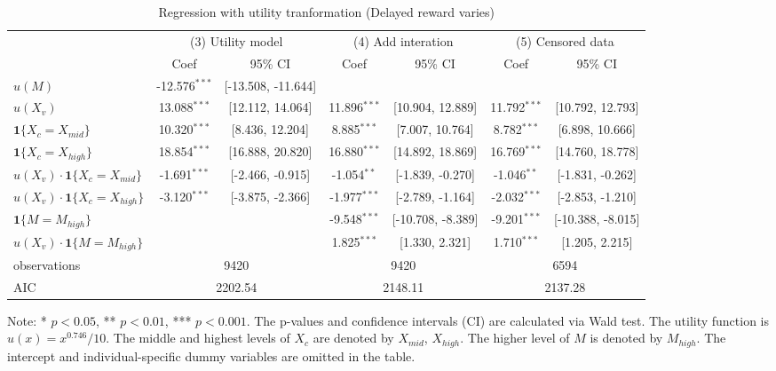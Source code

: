 \documentclass[12pt]{article}
\begin{document}
\begin{table}
    \centering
    \caption{Regression with utility tranformation (Delayed reward varies)}
    \vspace*{12pt}
        
\begin{tabular}{lcccccc}
  \hline
   & \multicolumn{2}{c}{(3) Utility model} & \multicolumn{2}{c}{(4) Add interation} & \multicolumn{2}{c}{(5) Censored data} \\ & Coef & 95\% CI & Coef & 95\% CI & Coef & 95\% CI \\ \hline
$u(M)$ & -12.576$^{***}$ & [-13.508, -11.644] &  &  &  &  \\ 
  $u(X_v)$ & 13.088$^{***}$ & [12.112, 14.064] & 11.896$^{***}$ & [10.904, 12.889] & 11.792$^{***}$ & [10.792, 12.793] \\ 
  $\textbf{1}\{X_c = X_{mid}\}$ & 10.320$^{***}$ & [8.436, 12.204] & 8.885$^{***}$ & [7.007, 10.764] & 8.782$^{***}$ & [6.898, 10.666] \\ 
  $\textbf{1}\{X_c = X_{high}\}$ & 18.854$^{***}$ & [16.888, 20.820] & 16.880$^{***}$ & [14.892, 18.869] & 16.769$^{***}$ & [14.760, 18.778] \\ 
  $u(X_v)\cdot\textbf{1}\{X_c = X_{mid}\}$ & -1.691$^{***}$ & [-2.466, -0.915] & -1.054$^{**}$ & [-1.839, -0.270] & -1.046$^{**}$ & [-1.831, -0.262] \\ 
  $u(X_v)\cdot\textbf{1}\{X_c = X_{high}\}$ & -3.120$^{***}$ & [-3.875, -2.366] & -1.977$^{***}$ & [-2.789, -1.164] & -2.032$^{***}$ & [-2.853, -1.210] \\ 
  $\textbf{1}\{M = M_{high}\}$ &  &  & -9.548$^{***}$ & [-10.708, -8.389] & -9.201$^{***}$ & [-10.388, -8.015] \\ 
  $u(X_v)\cdot\textbf{1}\{M = M_{high}\}$ &  &  & 1.825$^{***}$ & [1.330, 2.321] & 1.710$^{***}$ & [1.205, 2.215] \\ 
   \hline observations & \multicolumn{2}{c}{9420} & \multicolumn{2}{c}{9420} & \multicolumn{2}{c}{6594} \\ AIC & \multicolumn{2}{c}{2202.54} & \multicolumn{2}{c}{2148.11} & \multicolumn{2}{c}{2137.28} \\ \hline
\end{tabular}

	
	\vspace*{4pt}
    \centering
    \begin{minipage}{1.2\textwidth}
    {\par\footnotesize Note: * $p<0.05$, ** $p<0.01$, *** $p<0.001$. The p-values and confidence intervals (CI) are calculated via Wald test. The utility function is $u(x)=x^{0.746}/10$. The middle and highest levels of $X_c$ are denoted by $X_{mid}$, $X_{high}$. The higher level of $M$ is denoted by $M_{high}$. The intercept and individual-specific dummy variables are omitted in the table.}
    \end{minipage}
    \label{tab:utility-delayed}
\end{table}
\end{document}
